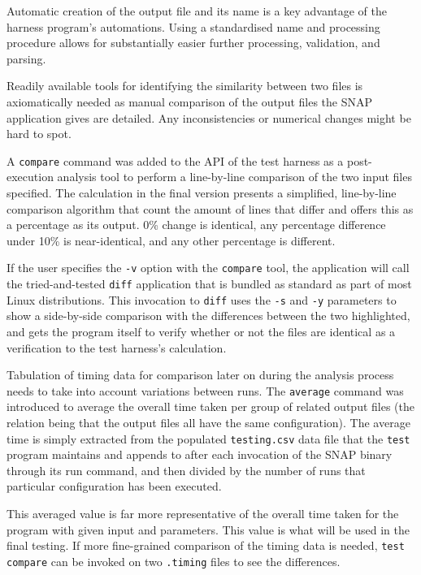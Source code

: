 \documentclass[conference]{IEEEtran}
\begin{document}
Automatic creation of the output file and its name is a key advantage of the harness program's automations. Using a standardised name and processing procedure allows for substantially easier further processing, validation, and parsing.

Readily available tools for identifying the similarity between two files is axiomatically needed as manual comparison of the output files the SNAP application gives are detailed. Any inconsistencies or numerical changes might be hard to spot.

A \texttt{compare} command was added to the API of the test harness as a post-execution analysis tool to perform a line-by-line comparison of the two input files specified. The calculation in the final version presents a simplified, line-by-line comparison algorithm that count the amount of lines that differ and offers this as a percentage as its output. 0\% change is identical, any percentage difference under 10\% is near-identical, and any other percentage is different.

If the user specifies the \texttt{-v} option with the \texttt{compare} tool, the application will call the tried-and-tested \texttt{diff} application that is bundled as standard as part of most Linux distributions. This invocation to \texttt{diff} uses the \texttt{-s} and \texttt{-y} parameters to show a side-by-side comparison with the differences between the two highlighted, and gets the program itself to verify whether or not the files are identical as a verification to the test harness's calculation.

Tabulation of timing data for comparison later on during the analysis process needs to take into account variations between runs. The \texttt{average} command was introduced to average the overall time taken per group of related output files (the relation being that the output files all have the same configuration). The average time is simply extracted from the populated \texttt{testing.csv} data file that the \texttt{test} program maintains and appends to after each invocation of the SNAP binary through its run command, and then divided by the number of runs that particular configuration has been executed.

This averaged value is far more representative of the overall time taken for the program with given input and parameters. This value is what will be used in the final testing. If more fine-grained comparison of the timing data is needed, \texttt{test compare} can be invoked on two \texttt{.timing} files to see the differences.
\end{document}
